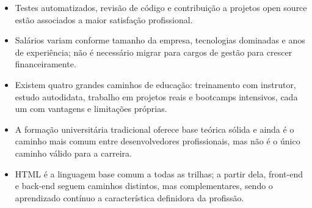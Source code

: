 \begin{itemize}
  \item Testes automatizados, revisão de código e contribuição a projetos open source estão associados a maior satisfação profissional.
\end{itemize}

\begin{itemize}
  \item Salários variam conforme tamanho da empresa, tecnologias dominadas e anos de experiência; não é necessário migrar para cargos de gestão para crescer financeiramente.
\end{itemize}

\begin{itemize}
  \item Existem quatro grandes caminhos de educação: treinamento com instrutor, estudo autodidata, trabalho em projetos reais e bootcamps intensivos, cada um com vantagens e limitações próprias.
\end{itemize}

\begin{itemize}
  \item A formação universitária tradicional oferece base teórica sólida e ainda é o caminho mais comum entre desenvolvedores profissionais, mas não é o único caminho válido para a carreira.
\end{itemize}

\begin{itemize}
  \item HTML é a linguagem base comum a todas as trilhas; a partir dela, front-end e back-end seguem caminhos distintos, mas complementares, sendo o aprendizado contínuo a característica definidora da profissão.
\end{itemize}
